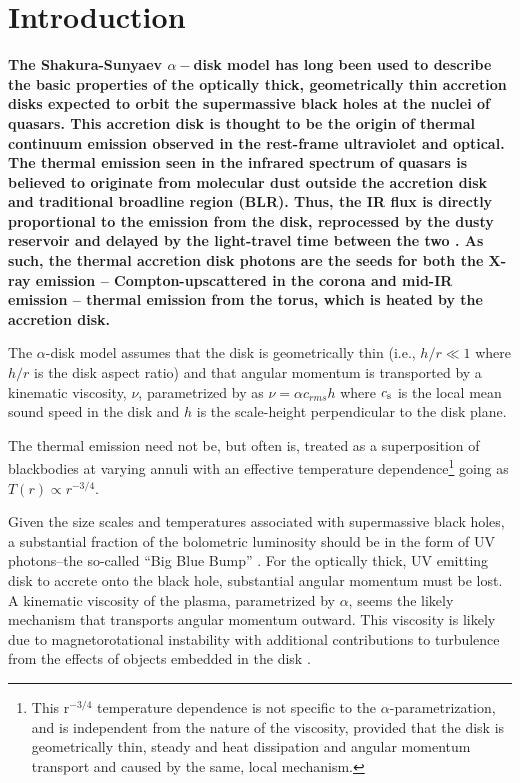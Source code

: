 \documentclass[a4paper,fleqn,usenatbib]{mnras}
\begin{document}
\section{Introduction}
{\bf 
The Shakura-Sunyaev $\alpha-$disk model \citep{SS73} has long been used to describe the basic properties of the optically thick, geometrically thin accretion disks expected to orbit the supermassive black holes at the nuclei of quasars. This accretion disk is thought to be the origin of thermal continuum emission observed in the rest-frame ultraviolet and optical. The thermal emission seen in the infrared spectrum of quasars is believed to originate from molecular dust outside the accretion disk and traditional broadline region (BLR). Thus, the IR flux is directly proportional to the emission from the disk, reprocessed by the dusty reservoir and delayed by the light-travel time between the two \citep[see ][for reviews]{Antonucci1993, Perlman2008, Lasota2016}. As such, the thermal accretion disk photons are the seeds for both the X-ray emission -- Compton-upscattered in the corona \citep[e.g.,][]{Begelman1983, Risaliti2009, Lusso2017} and mid-IR emission -- thermal emission from the torus, which is heated by the accretion disk.

The $\alpha$-disk model assumes that the disk is geometrically thin (i.e., $h/r \ll 1$ where $h/r$ is the disk aspect ratio) and that angular momentum is transported by a kinematic viscosity, $\nu$, parametrized by \citet{SS73} as $\nu = \alpha c_{rm s} h$ where $c_{\rm s}$ is the local mean sound speed in the disk and $h$ is the scale-height perpendicular to the disk plane.   

The thermal emission need not be, but often is, treated as a superposition of blackbodies at varying annuli with an effective temperature dependence\footnote{This r$^{-3/4}$ temperature dependence is not specific to the $\alpha$-parametrization, and is independent from the nature of the viscosity, provided that the disk is geometrically thin, steady and heat dissipation and angular momentum transport and caused by the same, local mechanism.} going as $T(r) \propto r^{-3/4}$. 

Given the size scales and temperatures associated with supermassive black holes, a substantial fraction of the bolometric luminosity should be in the form of UV photons--the so-called ``Big Blue Bump'' \citep{Shields1978, Malkan_Sargent1982}. For the optically thick, UV emitting disk to accrete onto the black hole, substantial angular momentum must be lost.  A kinematic viscosity of the plasma, parametrized by $\alpha$, seems the likely mechanism that transports angular momentum outward.  This viscosity is likely due to magnetorotational instability \citep[MRI; ][]{Balbus_Hawley1991} with additional contributions to turbulence from the effects of objects embedded in the disk \citep[e.g.,][]{McKernan2014}. 

}
\end{document}
